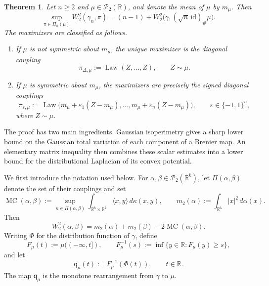 \documentclass[11pt]{amsart}
\newtheorem{theorem}{Theorem}[section]
\theoremstyle{definition}
\newcommand{\R}{\mathbb{R}}
\newcommand{\Pcal}{\mathcal{P}}
\newcommand{\Law}{\operatorname{Law}}
\newcommand{\W}{W}
\newcommand{\qmu}{\mathsf q_{\mu}}
\newcommand{\mtwo}{m_2}
\newcommand{\MC}{\operatorname{MC}}
\begin{document}
\begin{theorem}\label{thm:general}
Let $n\geq2$ and $\mu\in\Pcal_2(\R)$, and denote the mean of $\mu$ by
$m_\mu$. Then
\begin{equation}\label{eq:general-value}
  \sup_{\pi\in\Pi_n(\mu)}
  \W_2^2(\gamma_n,\pi)
  =
  (n-1)
  +
  \W_2^2\bigl(\gamma,(\sqrt n\,\mathrm{id})_\#\mu\bigr).
\end{equation}
The maximizers are classified as follows.
\begin{enumerate}[label=\textup{(\roman*)}]
  \item If $\mu$ is not symmetric about $m_\mu$, the unique maximizer is
  the diagonal coupling
  \[
    \pi_{\Delta,\mu}
    :=
    \Law(Z,\ldots,Z),
    \qquad Z\sim\mu.
  \]

  \item If $\mu$ is symmetric about $m_\mu$, the maximizers are precisely
  the signed diagonal couplings
  \begin{equation}\label{eq:signed-mu-diagonals}
    \pi_{\varepsilon,\mu}
    :=
    \Law\bigl(
      m_\mu+\varepsilon_1(Z-m_\mu),\ldots,
      m_\mu+\varepsilon_n(Z-m_\mu)
    \bigr),
    \qquad
    \varepsilon\in\{-1,1\}^n,
  \end{equation}
  where $Z\sim\mu$.
\end{enumerate}
\end{theorem}

The proof has two main ingredients. Gaussian isoperimetry gives a
sharp lower bound on the Gaussian total variation of each component
of a Brenier map. An elementary matrix inequality then combines these
scalar estimates into a lower bound for the distributional Laplacian
of its convex potential.

We first introduce the notation used below. For
$\alpha,\beta\in\Pcal_2(\R^k)$, let $\Pi(\alpha,\beta)$ denote the set
of their couplings and set
\[
  \MC(\alpha,\beta)
  :=
  \sup_{\kappa\in\Pi(\alpha,\beta)}
  \int_{\R^k\times\R^k}\langle x,y\rangle\,d\kappa(x,y),
  \qquad
  \mtwo(\alpha)
  :=
  \int_{\R^k}|x|^2\,d\alpha(x).
\]
Then
\[
  \W_2^2(\alpha,\beta)
  =
  \mtwo(\alpha)+\mtwo(\beta)-2\MC(\alpha,\beta).
\]
Writing $\Phi$ for the distribution function of $\gamma$, define
\[
  F_\mu(t):=\mu((-\infty,t]),
  \qquad
  F_\mu^{-1}(s):=\inf\{y\in\R:F_\mu(y)\geq s\},
\]
and let
\begin{equation}\label{eq:qmu-general}
  \qmu(t):=F_\mu^{-1}(\Phi(t)),
  \qquad t\in\R.
\end{equation}
The map $\qmu$ is the monotone rearrangement from $\gamma$ to $\mu$.
\end{document}

